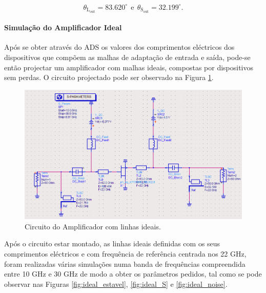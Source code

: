 \documentclass[11pt]{article}
\numberwithin{equation}{section}
\begin{document}
\vspace{-3mm}
\begin{equation}
\theta_{\text{L}_{\text{out}}} = 83.620^{\circ}  ~~ \text{e} ~~ \theta_{\text{S}_{\text{out}}} = 32.199^{\circ}.
\end{equation}

\vspace{1mm} 

\paragraph{Simulação do Amplificador Ideal} \hspace{0pt}  

Após se obter através do ADS os valores dos comprimentos eléctricos dos dispositivos que compõem as malhas de adaptação de entrada e saída, pode-se então projectar um amplificador com malhas ideais, compostas por dispositivos sem perdas. O circuito projectado pode ser observado na Figura \ref{fig:circ_ideal}.

\begin{figure}[H]
	\centering
	\includegraphics[keepaspectratio=true, scale=0.41]{exps/Circuito_ideal}
	\vspace{-0.5em}
	\caption{Circuito do Amplificador com linhas ideais.}
	\vspace{-0.8em}
	\label{fig:circ_ideal}
\end{figure}
 
Após o circuito estar montado, as linhas ideais definidas com os seus comprimentos eléctricos e com frequência de referência centrada nos 22 GHz, foram realizadas várias simulações numa banda de frequências compreendida entre 10 GHz e 30 GHz de modo a obter os parâmetros pedidos, tal como se pode observar nas Figuras \ref{fig:ideal_estavel}, \ref{fig:ideal_S} e \ref{fig:ideal_noise}.
\end{document}
